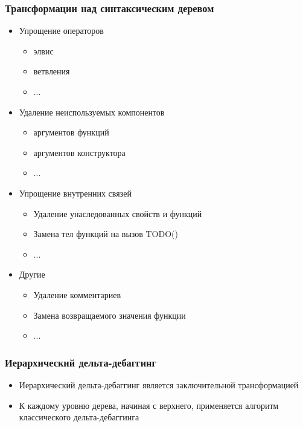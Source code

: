 \begin{frame}
	\frametitle{Трансформации над синтаксическим деревом}
		\footnotesize
		\begin{itemize}
			\item Упрощение операторов
				\begin{itemize}
				\footnotesize
					\item элвис
					\item ветвления
					\item ...
				\end{itemize}
			\item Удаление неиспользуемых компонентов
				\begin{itemize}
				\footnotesize
					\item аргументов функций
					\item аргументов конструктора
					\item ...
				\end{itemize}
			\item Упрощение внутренних связей
				\begin{itemize}
				\footnotesize
					\item Удаление унаследованных свойств и функций
					\item Замена тел функций на вызов TODO()
					\item ...
				\end{itemize}
			\item Другие
				\begin{itemize}
					\footnotesize
					\item Удаление комментариев
					\item Замена возвращаемого значения функции
					\item ...
				\end{itemize}
		\end{itemize}				
\end{frame}



\begin{frame}
	\frametitle{Иерархический дельта-дебаггинг}
		\begin{itemize}
			\item Иерархический дельта-дебаггинг является заключительной трансформацией
			\item К каждому уровню дерева, начиная с верхнего, применяется алгоритм классического дельта-дебаггинга
		\end{itemize}
\end{frame}

